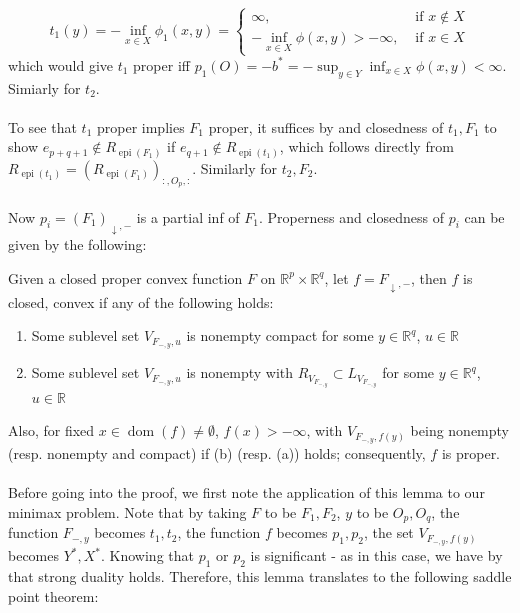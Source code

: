 \[
	t_1(y)=-\inf_{x\in X}\phi_1(x,y)=\begin{cases}
		\infty,                          & \text{ if }x\notin X \\
		-\inf_{x\in X}\phi(x,y)>-\infty, & \text{ if }x\in X
	\end{cases}
\]
which would give $t_1$ proper iff $p_1(O)=-b^\ast=-\sup_{y\in Y}\inf_{x\in X}\phi(x,y)<\infty$. Simiarly for $t_2$.
\paragraph{}To see that $t_1$ proper implies $F_1$ proper, it suffices by  and closedness of $t_1,F_1$ to show $e_{p+q+1}\notin R_{\operatorname{epi}(F_1)}$ if $e_{q+1}\notin R_{\operatorname{epi}(t_1)}$, which follows directly from $R_{\operatorname{epi}(t_1)}=(R_{\operatorname{epi}(F_1)})_{:,O_p,:}$. Similarly for $t_2,F_2$.

\paragraph{}Now $p_i=(F_1)_{\downarrow,-}$ is a partial inf of $F_1$. Properness and closedness of $p_i$ can be given by the following:

\begin{lemm}\label{lemm:047-proper-closed-partial-inf}
	Given a closed proper convex function $F$ on $\mathbb{R}^{p}\times \mathbb{R}^q$, let $f=F_{\downarrow,-}$, then $f$ is closed, convex if any of the following holds:
	\begin{enumerate}[label=(\alph*)]
		\item Some sublevel set $V_{F_{-,y},u}$ is nonempty compact for some $y\in \mathbb{R}^q$, $u\in \mathbb{R}$
		\item Some sublevel set $V_{F_{-,y},u}$ is nonempty with $R_{V_{F_{-,y}}}\subset L_{V_{F_{-,y}}}$ for some $y\in \mathbb{R}^q$, $u\in \mathbb{R}$
	\end{enumerate}
	Also, for fixed $x\in \operatorname{dom}(f)\neq\emptyset$, $f(x)>-\infty$, with $V_{F_{-,y},f(y)}$ being nonempty (resp. nonempty and compact) if (b) (resp. (a)) holds; consequently, $f$ is proper.
\end{lemm}

\paragraph{}Before going into the proof, we first note the application of this lemma to our minimax problem. Note that by taking $F$ to be $F_1,F_2$, $y$ to be $O_p,O_q$, the function $F_{-,y}$ becomes $t_1,t_2$, the function $f$ becomes $p_1,p_2$, the set $V_{F_{-,y},f(y)}$ becomes $Y^\ast,X^\ast$. Knowing that $p_1$ or $p_2$ is significant - as in this case, we have by  that strong duality holds. Therefore, this lemma translates to the following saddle point theorem:

